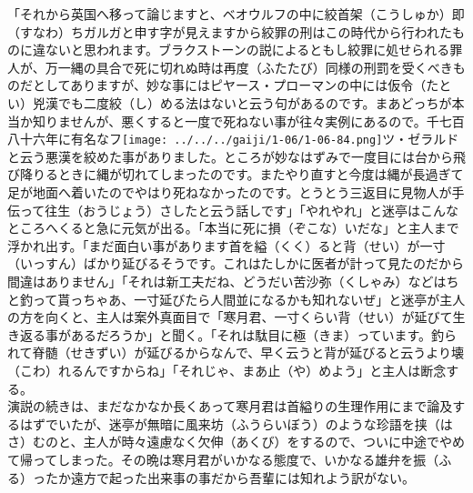 \documentclass{book}
\begin{document}
「それから英国へ移って論じますと、ベオウルフの中に絞首架（こうしゅか）即（すなわ）ちガルガと申す字が見えますから絞罪の刑はこの時代から行われたものに違ないと思われます。ブラクストーンの説によるともし絞罪に処せられる罪人が、万一縄の具合で死に切れぬ時は再度（ふたたび）同様の刑罰を受くべきものだとしてありますが、妙な事にはピヤース・プローマンの中には仮令（たとい）兇漢でも二度絞（し）める法はないと云う句があるのです。まあどっちが本当か知りませんが、悪くすると一度で死ねない事が往々実例にあるので。千七百八十六年に有名なフ\texttt{[image: ../../../gaiji/1-06/1-06-84.png]}ツ・ゼラルドと云う悪漢を絞めた事がありました。ところが妙なはずみで一度目には台から飛び降りるときに縄が切れてしまったのです。またやり直すと今度は縄が長過ぎて足が地面へ着いたのでやはり死ねなかったのです。とうとう三返目に見物人が手伝って往生（おうじょう）さしたと云う話しです」「やれやれ」と迷亭はこんなところへくると急に元気が出る。「本当に死に損（ぞこな）いだな」と主人まで浮かれ出す。「まだ面白い事があります首を縊（くく）ると背（せい）が一寸（いっすん）ばかり延びるそうです。これはたしかに医者が計って見たのだから間違はありません」「それは新工夫だね、どうだい苦沙弥（くしゃみ）などはちと釣って貰っちゃあ、一寸延びたら人間並になるかも知れないぜ」と迷亭が主人の方を向くと、主人は案外真面目で「寒月君、一寸くらい背（せい）が延びて生き返る事があるだろうか」と聞く。「それは駄目に極（きま）っています。釣られて脊髄（せきずい）が延びるからなんで、早く云うと背が延びると云うより壊（こわ）れるんですからね」「それじゃ、まあ止（や）めよう」と主人は断念する。\\
演説の続きは、まだなかなか長くあって寒月君は首縊りの生理作用にまで論及するはずでいたが、迷亭が無暗に風来坊（ふうらいぼう）のような珍語を挟（はさ）むのと、主人が時々遠慮なく欠伸（あくび）をするので、ついに中途でやめて帰ってしまった。その晩は寒月君がいかなる態度で、いかなる雄弁を振（ふる）ったか遠方で起った出来事の事だから吾輩には知れよう訳がない。\\
\end{document}

